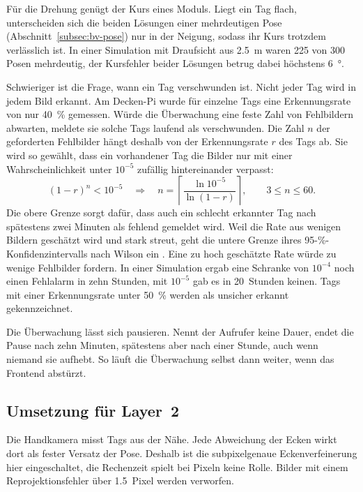 Für die Drehung genügt der Kurs eines Moduls. Liegt ein Tag flach, unterscheiden sich die beiden Lösungen einer mehrdeutigen Pose (Abschnitt~\ref{subsec:bv-pose}) nur in der Neigung, sodass ihr Kurs trotzdem verlässlich ist. In einer Simulation mit Draufsicht aus \SI{2,5}{\metre} waren 225 von 300 Posen mehrdeutig, der Kursfehler beider Lösungen betrug dabei höchstens \SI{6}{\degree}.

Schwieriger ist die Frage, wann ein Tag verschwunden ist. Nicht jeder Tag wird in jedem Bild erkannt. Am Decken-Pi wurde für einzelne Tags eine Erkennungsrate von nur \SI{40}{\percent} gemessen. Würde die Überwachung eine feste Zahl von Fehlbildern abwarten, meldete sie solche Tags laufend als verschwunden. Die Zahl $n$ der geforderten Fehlbilder hängt deshalb von der Erkennungsrate $r$ des Tags ab. Sie wird so gewählt, dass ein vorhandener Tag die Bilder nur mit einer Wahrscheinlichkeit unter $10^{-5}$ zufällig hintereinander verpasst:
\begin{equation}
    (1 - r)^n < 10^{-5}
    \quad\Rightarrow\quad
    n = \left\lceil \frac{\ln 10^{-5}}{\ln(1 - r)} \right\rceil, \qquad 3 \le n \le 60 .
    \label{eq:bv-fehlbilder}
\end{equation}
Die obere Grenze sorgt dafür, dass auch ein schlecht erkannter Tag nach spätestens zwei Minuten als fehlend gemeldet wird. Weil die Rate aus wenigen Bildern geschätzt wird und stark streut, geht die untere Grenze ihres 95-\%-Konfidenzintervalls nach Wilson ein \cite{Wilson1927}. Eine zu hoch geschätzte Rate würde zu wenige Fehlbilder fordern. In einer Simulation ergab eine Schranke von $10^{-4}$ noch einen Fehlalarm in zehn Stunden, mit $10^{-5}$ gab es in 20~Stunden keinen. Tags mit einer Erkennungsrate unter \SI{50}{\percent} werden als unsicher erkannt gekennzeichnet.

Die Überwachung lässt sich pausieren. Nennt der Aufrufer keine Dauer, endet die Pause nach zehn Minuten, spätestens aber nach einer Stunde, auch wenn niemand sie aufhebt. So läuft die Überwachung selbst dann weiter, wenn das Frontend abstürzt.

\subsection{Umsetzung für Layer~2}
\label{subsec:bv-layer2}
Die Handkamera misst Tags aus der Nähe. Jede Abweichung der Ecken wirkt dort als fester Versatz der Pose. Deshalb ist die subpixelgenaue Eckenverfeinerung hier eingeschaltet, die Rechenzeit spielt bei  Pixeln keine Rolle. Bilder mit einem Reprojektionsfehler über \SI{1,5}{Pixel} werden verworfen.

